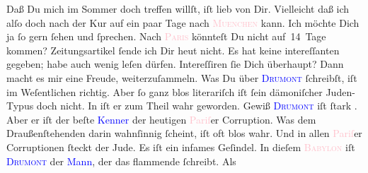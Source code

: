            \pstart
           {\pb}Daß Du mich im Sommer doch treffen willſt, iſt lieb
               von Dir. Vielleicht daß ich alſo doch nach der Kur auf ein paar Tage nach \textsc{\textcolor{pink}{Muenchen}{}\ledrightnote{\textcolor{pink}{München}}} kann. Ich möchte Dich ja ſo gern ſehen und ſprechen. Nach \textsc{\textcolor{pink}{Paris}{}\ledrightnote{\textcolor{pink}{Paris}}} könnteſt Du nicht auf 14 Tage kommen?\pend
           \pstart
           Zeitungsartikel ſende ich Dir heut nicht.  Es hat keine intereſſanten gegeben; habe auch
               wenig leſen dürfen. Intereſſiren ſie Dich überhaupt? Dann macht es mir eine Freude,
               weiterzuſammeln.\pend
           \pstart
           {\pb}Was Du über \textsc{\textcolor{blue}{Drumont}{}\ledrightnote{\textcolor{blue}{Édouard Drumont}}} ſchreibſt, iſt im Weſentlichen richtig. Aber ſo ganz blos literariſch iſt ſein
               dämoniſcher Juden-Typus doch nicht. In \label{K_L02729-6v}\label{K_L02729-6h} iſt er zum Theil wahr geworden. Gewiß \textsc{\textcolor{blue}{Drumont}{}\ledrightnote{\textcolor{blue}{Édouard Drumont}}} iſt ſtark \label{K_L02729-7v}\label{K_L02729-7h}. Aber er iſt der beſte \textcolor{blue}{Kenner}{} der heutigen \textcolor{pink}{Pariſ}{}\ledrightnote{\textcolor{pink}{Paris}}er Corruption. Was dem Draußenſtehenden darin \strikeout{\textcolor{gray}{d}} wahnſinnig ſcheint, iſt oft blos wahr. Und in allen \textcolor{pink}{Pariſ}{}\ledrightnote{\textcolor{pink}{Paris}}er Corruptionen ſteckt der Jude. Es iſt ein infames
               Geſindel. In dieſem \textsc{\textcolor{pink}{Babylon}{}}{ }{\pb}iſt \textsc{\textcolor{blue}{Drumont}{}\ledrightnote{\textcolor{blue}{Édouard Drumont}}} der \textcolor{blue}{Mann}{}, der das
               flammende \label{K_L02729-8v}\label{K_L02729-8h} ſchreibt. Als
